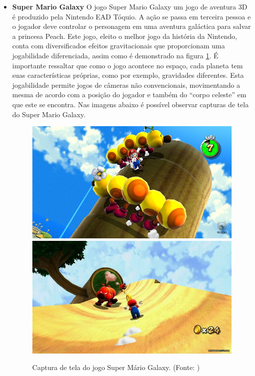 \begin{itemize}
\item {\bf Super Mario Galaxy}
O jogo Super Mario Galaxy 
um jogo de aventura 3D é produzido pela Nintendo EAD Tóquio. A ação se passa 
em terceira pessoa e o jogador deve controlar o personagem em uma aventura 
galáctica para salvar a princesa Peach.
Este jogo, eleito o melhor jogo da história da Nintendo, conta com diversificados 
efeitos gravitacionais que proporcionam uma jogabilidade diferenciada, assim como 
é demonstrado na figura \ref{img:mario}. É importante ressaltar que como o jogo acontece no 
espaço, cada planeta tem suas características próprias, como por exemplo, 
gravidades diferentes. 
Esta jogabilidade permite jogos de câmeras não convencionais, movimentando a
 mesma de acordo com a posição do jogador e também do ``corpo celeste'' em que
 este se encontra.
Nas imagens abaixo é possível observar capturas de tela do Super Mario Galaxy.

\begin{figure}[!ht]
 \centering
 \includegraphics[scale=0.4]{Imagens/mario1.png}
 \includegraphics[scale=0.4]{Imagens/mario2.png}
 \caption{Captura de tela do jogo Super Mário Galaxy.
(Fonte: \cite{bib:mario01,bib:mario02})}
 \label{img:mario}
\end{figure}


\end{itemize}
